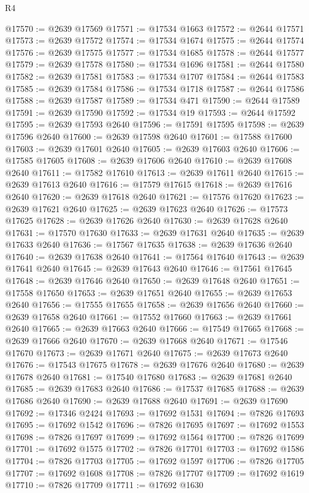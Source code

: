 \begin{lexlean}{R4}
\begin{coremodule}
@17570 := @2639 @17569
@17571 := @17534 @1663
@17572 := @2644 @17571
@17573 := @2639 @17572
@17574 := @17534 @1674
@17575 := @2644 @17574
@17576 := @2639 @17575
@17577 := @17534 @1685
@17578 := @2644 @17577
@17579 := @2639 @17578
@17580 := @17534 @1696
@17581 := @2644 @17580
@17582 := @2639 @17581
@17583 := @17534 @1707
@17584 := @2644 @17583
@17585 := @2639 @17584
@17586 := @17534 @1718
@17587 := @2644 @17586
@17588 := @2639 @17587
@17589 := @17534 @471
@17590 := @2644 @17589
@17591 := @2639 @17590
@17592 := @17534 @19
@17593 := @2644 @17592
@17595 := @2639 @17593 @2640
@17596 := @17591 @17595
@17598 := @2639 @17596 @2640
@17600 := @2639 @17598 @2640
@17601 := @17588 @17600
@17603 := @2639 @17601 @2640
@17605 := @2639 @17603 @2640
@17606 := @17585 @17605
@17608 := @2639 @17606 @2640
@17610 := @2639 @17608 @2640
@17611 := @17582 @17610
@17613 := @2639 @17611 @2640
@17615 := @2639 @17613 @2640
@17616 := @17579 @17615
@17618 := @2639 @17616 @2640
@17620 := @2639 @17618 @2640
@17621 := @17576 @17620
@17623 := @2639 @17621 @2640
@17625 := @2639 @17623 @2640
@17626 := @17573 @17625
@17628 := @2639 @17626 @2640
@17630 := @2639 @17628 @2640
@17631 := @17570 @17630
@17633 := @2639 @17631 @2640
@17635 := @2639 @17633 @2640
@17636 := @17567 @17635
@17638 := @2639 @17636 @2640
@17640 := @2639 @17638 @2640
@17641 := @17564 @17640
@17643 := @2639 @17641 @2640
@17645 := @2639 @17643 @2640
@17646 := @17561 @17645
@17648 := @2639 @17646 @2640
@17650 := @2639 @17648 @2640
@17651 := @17558 @17650
@17653 := @2639 @17651 @2640
@17655 := @2639 @17653 @2640
@17656 := @17555 @17655
@17658 := @2639 @17656 @2640
@17660 := @2639 @17658 @2640
@17661 := @17552 @17660
@17663 := @2639 @17661 @2640
@17665 := @2639 @17663 @2640
@17666 := @17549 @17665
@17668 := @2639 @17666 @2640
@17670 := @2639 @17668 @2640
@17671 := @17546 @17670
@17673 := @2639 @17671 @2640
@17675 := @2639 @17673 @2640
@17676 := @17543 @17675
@17678 := @2639 @17676 @2640
@17680 := @2639 @17678 @2640
@17681 := @17540 @17680
@17683 := @2639 @17681 @2640
@17685 := @2639 @17683 @2640
@17686 := @17537 @17685
@17688 := @2639 @17686 @2640
@17690 := @2639 @17688 @2640
@17691 := @2639 @17690
@17692 := @17346 @2424
@17693 := @17692 @1531
@17694 := @7826 @17693
@17695 := @17692 @1542
@17696 := @7826 @17695
@17697 := @17692 @1553
@17698 := @7826 @17697
@17699 := @17692 @1564
@17700 := @7826 @17699
@17701 := @17692 @1575
@17702 := @7826 @17701
@17703 := @17692 @1586
@17704 := @7826 @17703
@17705 := @17692 @1597
@17706 := @7826 @17705
@17707 := @17692 @1608
@17708 := @7826 @17707
@17709 := @17692 @1619
@17710 := @7826 @17709
@17711 := @17692 @1630

\end{coremodule}
\end{lexlean}
